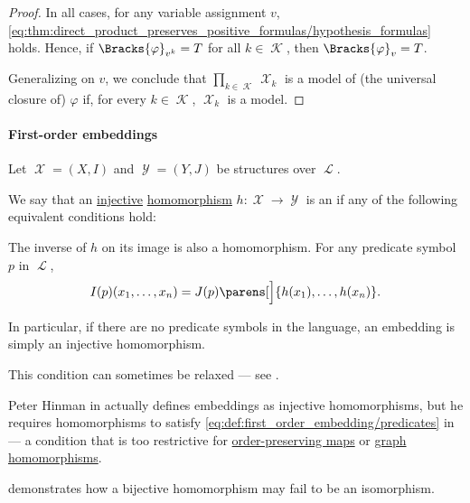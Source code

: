 \begin{proof}
  In all cases, for any variable assignment \( v \), \eqref{eq:thm:direct_product_preserves_positive_formulas/hypothesis_formulas} holds. Hence, if \( \Bracks{\varphi}_{v^k} = T \) for all \( k \in \mscrK \), then \( \Bracks{\varphi}_v = T \).

  Generalizing on \( v \), we conclude that \( \prod_{k \in \mscrK} \mscrX_k \) is a model of (the universal closure of) \( \varphi \) if, for every \( k \in \mscrK \), \( \mscrX_k \) is a model.
\end{proof}

\paragraph{First-order embeddings}

\begin{definition}\label{def:first_order_embedding}
  Let \( \mscrX = (X, I) \) and \( \mscrY = (Y, J) \) be structures over \( \mscrL \).

  We say that an \hyperref[def:function_invertibility/injective]{injective} \hyperref[def:first_order_homomorphism]{homomorphism} \( h: \mscrX \to \mscrY \) is an  if any of the following equivalent conditions hold:

  \begin{thmenum}
     The inverse of \( h \) on its image is also a homomorphism.
     For any predicate symbol \( p \) in \( \mscrL \),
    \begin{equation}\label{eq:def:first_order_embedding/predicates}
      I(p) (x_1, \ldots, x_n) = J(p) \parens[\Big]{ h(x_1), \ldots, h(x_n) }.
    \end{equation}
  \end{thmenum}
\end{definition}
\begin{comments}
  \item In particular, if there are no predicate symbols in the language, an embedding is simply an injective homomorphism.

  \item This condition can sometimes be relaxed --- see .

  \item Peter Hinman in  actually defines embeddings as injective homomorphisms, but he requires homomorphisms to satisfy \eqref{eq:def:first_order_embedding/predicates} in \cite[def. 2.3.26(i)]{Hinman2005} --- a condition that is too restrictive for \hyperref[def:order_function]{order-preserving maps} or \hyperref[def:directed_graph/homomorphism]{graph homomorphisms}.

  \item {} demonstrates how a bijective homomorphism may fail to be an isomorphism.
\end{comments}
